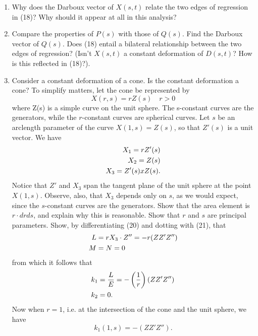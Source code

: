 \documentclass{book}
\begin{document}
\begin{enumerate}
  \item[15.] Why does the Darboux vector of $X(s,t)$ relate the two edges of regression in (18)? Why should it appear at all in this analysis?
  \item[16.] Compare the properties of $P(s)$ with those of $Q(s)$. Find the Darboux vector of $Q(s)$. Does (18) entail a bilateral relationship between the two edges of regression? (Isn't $X(s,t)$ a constant deformation of $D(s,t)$? How is this reflected in (18)?).
  \item[17.] Consider a constant deformation of a cone. Is the constant deformation a cone? To simplify matters, let the cone be represented by
    \begin{equation}
      X(r,s) = rZ(s) \quad r > 0
    \end{equation}
    where Z(s) is a simple curve on the unit sphere. The s-constant curves are the generators, while the $r$-constant curves are spherical curves. Let $s$ be an arclength parameter of the curve $X(1,s) = Z(s)$, so that $Z'(s)$ is a unit vector. We have
    \begin{align}
      X_{1} = rZ'(s) \notag \\
      X_{2} = Z(s) \\
      X_{3} = Z'(s) x Z(s). \notag
    \end{align}
    Notice that $Z'$ and $X_{3}$ span the tangent plane of the unit sphere at the point $X(1,s)$. Observe, also, that $X_{3}$ depends only on $s$, as we would expect, since the $s$-constant curves are the generators. Show that the area element is $r \cdot dr ds$, and explain why this is reasonable. Show that $r$ and $s$ are principal parameters. Show, by differentiating (20) and dotting with (21), that
    \begin{align}
      L & = rX_{3} \cdot Z'' = -r(ZZ' Z'') \\
      M & = N = 0 \notag
    \end{align}
    from which it follows that
    \begin{align}
      k_{1} & = \frac{L}{E} = - \left( \frac{1}{r} \right) (ZZ' Z'') \\
      k_{2} & = 0. \notag
    \end{align}
    Now when $r = 1$, i.e. at the intersection of the cone and the unit sphere, we have
    \begin{equation}
      k_{1}(1,s) = -(ZZ' Z'').
    \end{equation}

\end{enumerate}
\end{document}
